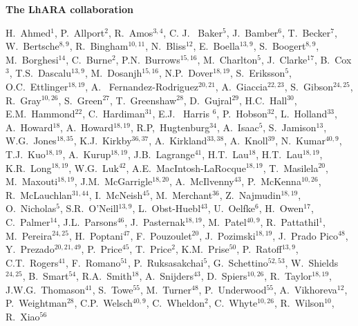 \vspace{0.75cm}
\begin{center}
  {\bf \color{BlueViolet} The LhARA collaboration} \\
\end{center}
\vspace{0.50cm}
\begin{center}
  H.~Ahmed$^{1}$,
  P.~Allport$^{2}$,
  R.~Amos$^{3,4}$,
  C. J. ~Baker$^{5}$,
  J.~Bamber$^{6}$,
  T.~Becker$^{7}$,
  W.~Bertsche$^{8,9}$,
  R.~Bingham$^{10,11}$,
  N.~Bliss$^{12}$,
  E.~Boella$^{13,9}$,
  S.~Boogert$^{8,9}$,
  M.~Borghesi$^{14}$,
  C.~Burne$^{2}$,
  P.N.~Burrows$^{15,16}$,
  M.~Charlton$^{5}$,
  J.~Clarke$^{17}$,
  B.~Cox$^{3}$,
  T.S.~Dascalu$^{13,9}$,
  M.~Dosanjh$^{15,16}$,
  N.P.~Dover$^{18,19}$,
  S.~Eriksson$^{5}$,
  O.C.~Ettlinger$^{18,19}$,
  A. ~Fernandez-Rodriguez$^{20,21}$,
  A.~Giaccia$^{22,23}$,
  S.~Gibson$^{24,25}$,
  R.~Gray$^{10,26}$,
  S.~Green$^{27}$,
  T.~Greenshaw$^{28}$,
  D.~Gujral$^{29}$,
  H.C.~Hall$^{30}$,
  E.M.~Hammond$^{22}$,
  C.~Hardiman$^{31}$,
  E.J. ~Harris $^{6}$,
  P.~Hobson$^{32}$,
  L.~Holland$^{33}$,
  A.~Howard$^{18}$,
  A.~Howard$^{18,19}$,
  R.P,~Hugtenburg$^{34}$,
  A.~Isaac$^{5}$,
  S.~Jamison$^{13}$,
  W.G.~Jones$^{18,35}$,
  K.J.~Kirkby$^{36,37}$,
  A.~Kirkland$^{33,38}$,
  A.~Knoll$^{39}$,
  N.~Kumar$^{40,9}$,
  T.J.~Kuo$^{18,19}$,
  A.~Kurup$^{18,19}$,
  J.B.~Lagrange$^{41}$,
  H.T.~Lau$^{18}$,
  H.T.~Lau$^{18,19}$,
  K.R.~Long$^{18,19}$,
  W.G.~Luk$^{42}$,
  A.E.~MacIntosh-LaRocque$^{18,19}$,
  T.~Masilela$^{20}$,
  M.~Maxouti$^{18,19}$,
  J.M.~McGarrigle$^{18,20}$,
  A.~McIlvenny$^{43}$,
  P.~McKenna$^{10,26}$,
  R.~McLauchlan$^{31,44}$,
  I.~McNeish$^{45}$,
  M.~Merchant$^{36}$,
  Z.~Najmudin$^{18,19}$,
  O.~Nicholas$^{5}$,
  S.R.~O'Neill$^{13,9}$,
  L.~Obst-Huebl$^{43}$,
  U.~Oelfke$^{6}$,
  H.~Owen$^{17}$,
  C.~Palmer$^{14}$,
  J.L.~Parsons$^{46}$,
  J.~Pasternak$^{18,19}$,
  M.~Patel$^{40,9}$,
  R.~Pattathil$^{1}$,
  M.~Pereira$^{24,25}$,
  H.~Poptani$^{47}$,
  F.~Pouzoulet$^{20}$,
  J.~Pozimski$^{18,19}$,
  J.~Prado Pico$^{48}$,
  Y.~Prezado$^{20,21,49}$,
  P.~Price$^{45}$,
  T.~Price$^{2}$,
  K.M.~Prise$^{50}$,
  P.~Ratoff$^{13,9}$,
  C.T.~Rogers$^{41}$,
  F.~Romano$^{51}$,
  P.~Ruksasakchai$^{5}$,
  G.~Schettino$^{52,53}$,
  W.~Shields$^{24,25}$,
  B.~Smart$^{54}$,
  R.A.~Smith$^{18}$,
  A.~Snijders$^{43}$,
  D.~Spiers$^{10,26}$,
  R.~Taylor$^{18,19}$,
  J.W.G.~Thomason$^{41}$,
  S.~Towe$^{55}$,
  M.~Turner$^{48}$,
  P.~Underwood$^{55}$,
  A.~Vikhoreva$^{12}$,
  P.~Weightman$^{28}$,
  C.P.~Welsch$^{40,9}$,
  C.~Wheldon$^{2}$,
  C.~Whyte$^{10,26}$,
  R.~Wilson$^{10}$,
  R.~Xiao$^{56}$
\end{center}

